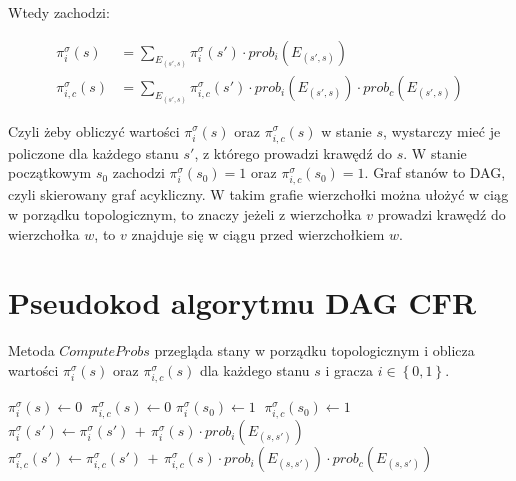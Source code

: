 \documentclass[licencjacka]{pracamgr}
\begin{document}
\noindent
Wtedy zachodzi:

\begin{align*}
\pi_i^{\sigma}(s) &= \sum\limits_{E_{(s', s)}} \pi_i^{\sigma}(s') \cdot prob_i(E_{(s', s)}) \\
\pi_{i, c}^{\sigma}(s) &= \sum\limits_{E_{(s', s)}} \pi_{i, c}^{\sigma}(s') \cdot prob_i(E_{(s', s)}) \cdot prob_c(E_{(s', s)})
\end{align*}

\noindent
Czyli żeby obliczyć wartości $\pi_i^{\sigma}(s)$ oraz $\pi_{i, c}^{\sigma}(s)$ w stanie $s$, wystarczy
mieć je policzone dla każdego stanu $s'$, z którego prowadzi krawędź do $s$. W stanie początkowym $s_0$ zachodzi
$\pi_i^{\sigma}(s_0) = 1$ oraz $\pi_{i, c}^{\sigma}(s_0) = 1$. Graf stanów to DAG, czyli
skierowany graf acykliczny. W takim grafie wierzchołki można ułożyć w ciąg w porządku topologicznym, to znaczy
jeżeli z wierzchołka $v$ prowadzi krawędź do wierzchołka $w$, to $v$ znajduje się w ciągu przed wierzchołkiem $w$.

\section{Pseudokod algorytmu DAG CFR}

\noindent
Metoda $ComputeProbs$ przegląda stany w porządku topologicznym i oblicza wartości $\pi_i^{\sigma}(s)$ oraz $\pi_{i, c}^{\sigma}(s)$
dla każdego stanu $s$ i gracza $i \in \left\{0, 1\right\}$. \\ 

\begin{algorithmic}
        \State $\pi_i^{\sigma}(s) \gets 0$ $ \; \pi_{i,c}^{\sigma}(s) \gets 0$
        \State $\pi_i^{\sigma}(s_0) \gets 1$ $ \; \pi_{i,c}^{\sigma}(s_0) \gets 1$
                \State $\pi_i^{\sigma}(s') \gets \pi_i^{\sigma}(s') \, + \, \pi_i^{\sigma}(s) \cdot prob_i(E_{(s, s')})$ 
                \State $\pi_{i,c}^{\sigma}(s') \gets \pi_{i,c}^{\sigma}(s') \, + \, \pi_{i,c}^{\sigma}(s) \cdot prob_i(E_{(s, s')}) \cdot prob_c(E_{(s, s')})$ 
            \EndFor
        \EndFor
    \EndFunction
\end{algorithmic}
\end{document}
